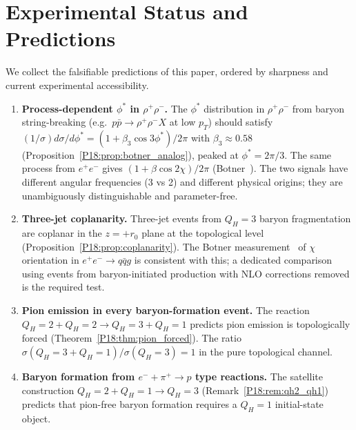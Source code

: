 \documentclass[11pt,a4paper]{article}
\theoremstyle{definition}\newtheorem{definition}[theorem]{Definition}
\theoremstyle{remark}
\newcommand{\QH}{Q_H}
\newcommand{\phistar}{\phi^*}
\begin{document}
\section{Experimental Status and Predictions}
\label{P18:sec:experiment}

We collect the falsifiable predictions of this paper, ordered by
sharpness and current experimental accessibility.

\begin{enumerate}[leftmargin=2em,label=\textbf{P\arabic*.}]

\item \textbf{Process-dependent $\phistar$ in $\rho^+\rho^-$.}
The $\phistar$ distribution in $\rho^+\rho^-$ from baryon
string-breaking (e.g.\ $p\bar{p}\to\rho^+\rho^-X$ at low
$p_T$) should satisfy $(1/\sigma)d\sigma/d\phistar =
(1+\beta_3\cos 3\phistar)/2\pi$ with $\beta_3\approx0.58$
(Proposition~\ref{P18:prop:botner_analog}), peaked at
$\phistar=2\pi/3$.  The same process from $e^+e^-$ gives
$(1+\beta\cos 2\chi)/2\pi$ (Botner~\cite{Botner1992}).
The two signals have different angular frequencies (3 vs 2)
and different physical origins; they are unambiguously
distinguishable and parameter-free.

\item \textbf{Three-jet coplanarity.}
Three-jet events from $\QH=3$ baryon fragmentation are coplanar
in the $z=+r_0$ plane at the topological level
(Proposition~\ref{P18:prop:coplanarity}).  The Botner
measurement~\cite{Botner1992} of $\chi$ orientation in
$e^+e^-\to q\bar{q}g$ is consistent with this; a dedicated
comparison using events from baryon-initiated production with
NLO corrections removed is the required test.

\item \textbf{Pion emission in every baryon-formation event.}
The reaction $\QH=2+\QH=2\to\QH=3+\QH=1$ predicts pion
emission is topologically forced (Theorem~\ref{P18:thm:pion_forced}).
The ratio $\sigma(\QH=3+\QH=1)/\sigma(\QH=3)=1$ in the pure
topological channel.

\item \textbf{Baryon formation from $e^-+\pi^+\to p$ type reactions.}
The satellite construction $\QH=2+\QH=1\to\QH=3$
(Remark~\ref{P18:rem:qh2_qh1}) predicts that pion-free baryon
formation requires a $\QH=1$ initial-state object.


\end{enumerate}
\end{document}
